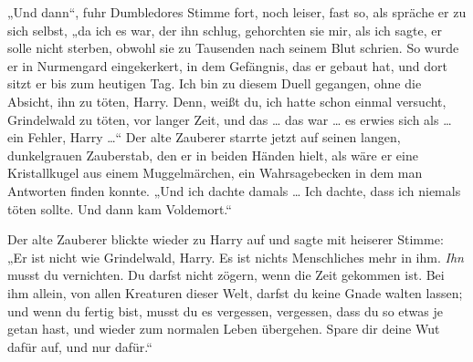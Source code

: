 „Und dann“, fuhr Dumbledores Stimme fort, noch leiser, fast so, als spräche er zu sich selbst, „da ich es war, der ihn schlug, gehorchten sie mir, als ich sagte, er solle nicht sterben, obwohl sie zu Tausenden nach seinem Blut schrien. So wurde er in Nurmengard eingekerkert, in dem Gefängnis, das er gebaut hat, und dort sitzt er bis zum heutigen Tag. Ich bin zu diesem Duell gegangen, ohne die Absicht, ihn zu töten, Harry. Denn, weißt du, ich hatte schon einmal versucht, Grindelwald zu töten, vor langer Zeit, und das … das war … es erwies sich als … ein Fehler, Harry …“ Der alte Zauberer starrte jetzt auf seinen langen, dunkelgrauen Zauberstab, den er in beiden Händen hielt, als wäre er eine Kristallkugel aus einem Muggelmärchen, ein Wahrsagebecken in dem man Antworten finden konnte.
„Und ich dachte damals … Ich dachte, dass ich niemals töten sollte. Und dann kam Voldemort.“

Der alte Zauberer blickte wieder zu Harry auf und sagte mit heiserer Stimme:
„Er ist nicht wie Grindelwald, Harry. Es ist nichts Menschliches mehr in ihm. \emph{Ihn} musst du vernichten. Du darfst nicht zögern, wenn die Zeit gekommen ist. Bei ihm allein, von allen Kreaturen dieser Welt, darfst du keine Gnade walten lassen; und wenn du fertig bist, musst du es vergessen, vergessen, dass du so etwas je getan hast, und wieder zum normalen Leben übergehen. Spare dir deine Wut dafür auf, und nur dafür.“

